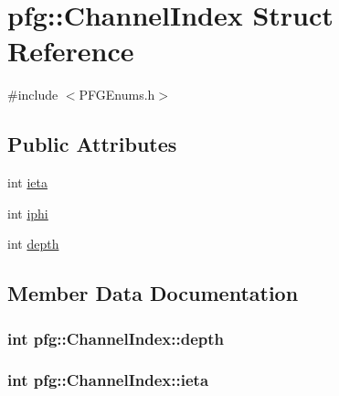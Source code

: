 \hypertarget{structpfg_1_1_channel_index}{}\section{pfg\+:\+:Channel\+Index Struct Reference}
\label{structpfg_1_1_channel_index}


{\ttfamily \#include $<$P\+F\+G\+Enums.\+h$>$}

\subsection*{Public Attributes}
\begin{DoxyCompactItemize}
\item 
int \hyperlink{structpfg_1_1_channel_index_ab3e6f9ef72fb131bfa3740d93ad136c5}{ieta}
\item 
int \hyperlink{structpfg_1_1_channel_index_af07100d9ef0b2b17cfff4b70f5297986}{iphi}
\item 
int \hyperlink{structpfg_1_1_channel_index_aa074b0acf7c0a780ff3ab830e72487ab}{depth}
\end{DoxyCompactItemize}


\subsection{Member Data Documentation}
\hypertarget{structpfg_1_1_channel_index_aa074b0acf7c0a780ff3ab830e72487ab}{}
\subsubsection[{depth}]{\setlength{\rightskip}{0pt plus 5cm}int pfg\+::\+Channel\+Index\+::depth}\label{structpfg_1_1_channel_index_aa074b0acf7c0a780ff3ab830e72487ab}
\hypertarget{structpfg_1_1_channel_index_ab3e6f9ef72fb131bfa3740d93ad136c5}{}
\subsubsection[{ieta}]{\setlength{\rightskip}{0pt plus 5cm}int pfg\+::\+Channel\+Index\+::ieta}\label{structpfg_1_1_channel_index_ab3e6f9ef72fb131bfa3740d93ad136c5}
\hypertarget{structpfg_1_1_channel_index_af07100d9ef0b2b17cfff4b70f5297986}{}
